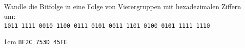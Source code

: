 \question[2]
Wandle die Bitfolge in eine Folge von Vierergruppen
mit hexadezimalen Ziffern um: \\
\texttt{1011 1111 0010 1100 0111 0101 0011 1101 0100 0101 1111 1110}

\begin{solutionbox}{1cm}
\texttt{BF2C 753D 45FE}
\end{solutionbox}
